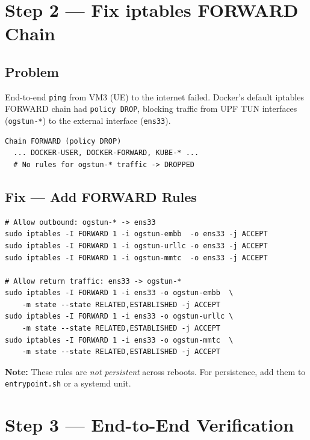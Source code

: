 \documentclass[12pt,a4paper]{article}
\begin{document}
\section{Step 2 — Fix iptables FORWARD Chain}

\subsection{Problem}

End-to-end \texttt{ping} from VM3 (UE) to the internet failed. Docker's default iptables FORWARD chain had \texttt{policy DROP}, blocking traffic from UPF TUN interfaces (\texttt{ogstun-*}) to the external interface (\texttt{ens33}).

\begin{lstlisting}[style=terminal]
Chain FORWARD (policy DROP)
  ... DOCKER-USER, DOCKER-FORWARD, KUBE-* ...
  # No rules for ogstun-* traffic -> DROPPED
\end{lstlisting}

\subsection{Fix — Add FORWARD Rules}

\begin{lstlisting}[style=terminal]
# Allow outbound: ogstun-* -> ens33
sudo iptables -I FORWARD 1 -i ogstun-embb  -o ens33 -j ACCEPT
sudo iptables -I FORWARD 1 -i ogstun-urllc -o ens33 -j ACCEPT
sudo iptables -I FORWARD 1 -i ogstun-mmtc  -o ens33 -j ACCEPT

# Allow return traffic: ens33 -> ogstun-*
sudo iptables -I FORWARD 1 -i ens33 -o ogstun-embb  \
    -m state --state RELATED,ESTABLISHED -j ACCEPT
sudo iptables -I FORWARD 1 -i ens33 -o ogstun-urllc \
    -m state --state RELATED,ESTABLISHED -j ACCEPT
sudo iptables -I FORWARD 1 -i ens33 -o ogstun-mmtc  \
    -m state --state RELATED,ESTABLISHED -j ACCEPT
\end{lstlisting}

\textbf{Note:} These rules are \emph{not persistent} across reboots. For persistence, add them to \texttt{entrypoint.sh} or a systemd unit.


\section{Step 3 — End-to-End Verification}
\end{document}
